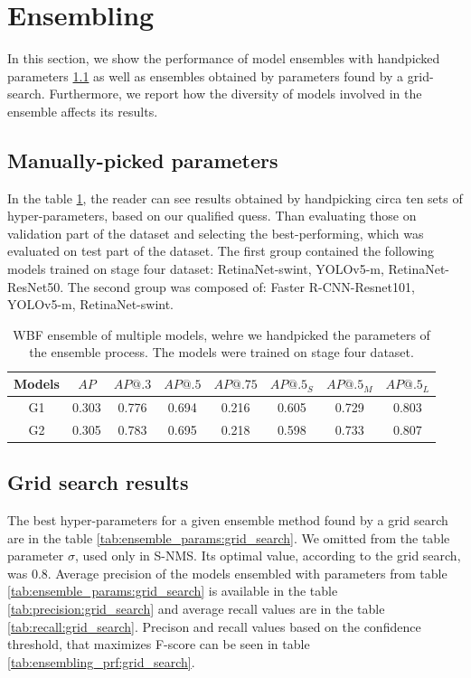 \section{Ensembling}
\label{sec:ensembling_results}
In this section, we show the performance of model ensembles with handpicked parameters \ref{subsec:handpicked} as well as ensembles obtained by parameters found by a grid-search. Furthermore, we report how the diversity of models involved in the ensemble affects its results.
\subsection{Manually-picked parameters}
\label{subsec:handpicked}
In the table \ref{tab:model_ensembling:handpicked}, the reader can see results obtained by handpicking circa ten sets of hyper-parameters, based on our qualified quess. Than evaluating those on validation part of the dataset and selecting the best-performing, which was evaluated on test part of the dataset. The first group contained the following models trained on stage four dataset: RetinaNet-swint, YOLOv5-m, RetinaNet-ResNet50. The second group was composed of: Faster R-CNN-Resnet101, YOLOv5-m, RetinaNet-swint.
\begin{table}[H]
    \begin{tabular}{|c|c|c|c|c|c|c|c|}
        \hline
        Models & $AP$  & $AP@.3$ & $AP@.5$ & $AP@.75$ & $AP@.5_S$ & $AP@.5_M$ & $AP@.5_L$ \\ \hline
        G1     & 0.303 & 0.776   & 0.694   & 0.216    & 0.605     & 0.729     & 0.803     \\ \hline
        G2     & 0.305 & 0.783   & 0.695   & 0.218    & 0.598     & 0.733     & 0.807     \\ \hline
    \end{tabular}
    \caption{WBF ensemble of multiple models, wehre we handpicked the parameters of the ensemble process. The models were trained on stage four dataset.}
    \label{tab:model_ensembling:handpicked}
\end{table}
\subsection{Grid search results}
\label{subsec:gridsearched}
The best hyper-parameters for a given ensemble method found by a grid search are in the table \ref{tab:ensemble_params:grid_search}. We omitted from the table parameter $\sigma$, used only in S-NMS. Its optimal value, according to the grid search, was $0.8$.
Average precision of the models ensembled with parameters from table \ref{tab:ensemble_params:grid_search} is available in the table \ref{tab:precision:grid_search} and average recall values are in the table \ref{tab:recall:grid_search}. Precison and recall values based on the confidence threshold, that maximizes F-score can be seen in table \ref{tab:ensembling_prf:grid_search}.

